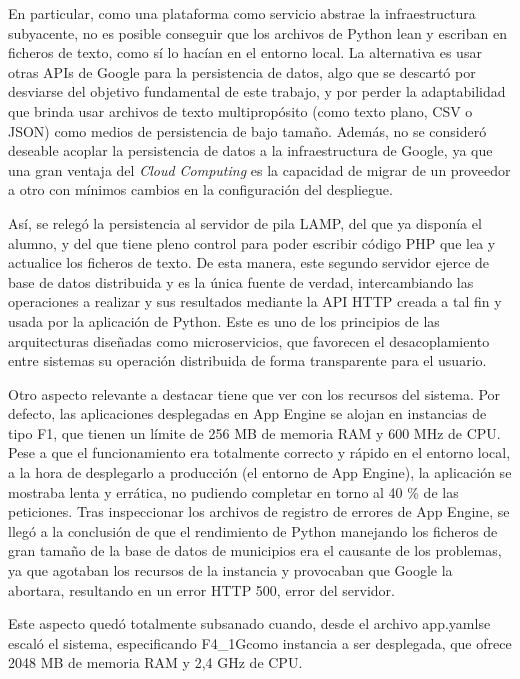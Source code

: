 En particular, como una plataforma como servicio abstrae la infraestructura subyacente, no es posible conseguir que los archivos de Python lean y escriban en ficheros de texto, como sí lo hacían en el entorno local. La alternativa es usar otras APIs de Google para la persistencia de datos, algo que se descartó por desviarse del objetivo fundamental de este trabajo, y por perder la adaptabilidad que brinda usar archivos de texto multipropósito (como texto plano, CSV o JSON) como medios de persistencia de bajo tamaño. Además, no se consideró deseable acoplar la persistencia de datos a la infraestructura de Google, ya que una gran ventaja del \textit{Cloud Computing} es la capacidad de migrar de un proveedor a otro con mínimos cambios en la configuración del despliegue.

Así, se relegó la persistencia al servidor de pila LAMP, del que ya disponía el alumno, y del que tiene pleno control para poder escribir código PHP que lea y actualice los ficheros de texto. De esta manera, este segundo servidor ejerce de base de datos distribuida y es la única fuente de verdad, intercambiando las operaciones a realizar y sus resultados mediante la API HTTP creada a tal fin y usada por la aplicación de Python. Este es uno de los principios de las arquitecturas diseñadas como microservicios, que favorecen el desacoplamiento entre sistemas su operación distribuida de forma transparente para el usuario.

Otro aspecto relevante a destacar tiene que ver con los recursos del sistema. Por defecto, las aplicaciones desplegadas en App Engine se alojan en instancias de tipo \guillemotleft F1\guillemotright, que tienen un límite de 256 MB de memoria RAM y 600 MHz de CPU. Pese a que el funcionamiento era totalmente correcto y rápido en el entorno local, a la hora de desplegarlo a producción (el entorno de App Engine), la aplicación se mostraba lenta y errática, no pudiendo completar en torno al 40 \% de las peticiones. Tras inspeccionar los archivos de registro de errores de App Engine, se llegó a la conclusión de que el rendimiento de Python manejando los ficheros de gran tamaño de la base de datos de municipios era el causante de los problemas, ya que agotaban los recursos de la instancia y provocaban que Google la abortara, resultando en un error HTTP 500, error del servidor.

Este aspecto quedó totalmente subsanado cuando, desde el archivo \guillemotleft app.yaml\guillemotright\space se escaló el sistema, especificando \guillemotleft F4\_1G\guillemotright\space como instancia a ser desplegada, que ofrece 2048 MB de memoria RAM y 2,4 GHz de CPU.

